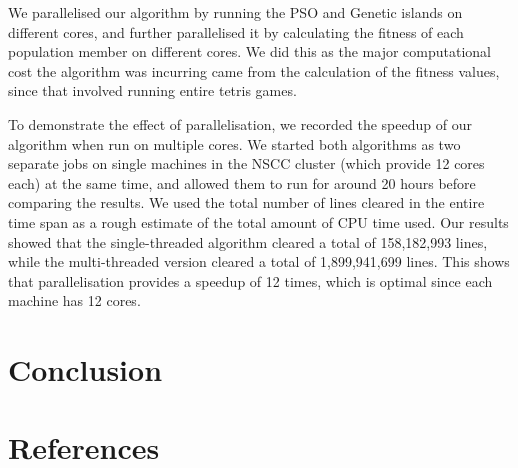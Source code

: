 \documentclass{article}
\begin{document}
We parallelised our algorithm by running the PSO and Genetic islands on
different cores, and further parallelised it by calculating the fitness of each
population member on different cores.  We did this as the major computational
cost the algorithm was incurring came from the calculation of the fitness
values, since that involved running entire tetris games.

To demonstrate the effect of parallelisation, we recorded the speedup of our
algorithm when run on multiple cores. We started both algorithms as two
separate jobs on single machines in the NSCC cluster (which provide 12 cores
each) at the same time, and allowed them to run for around 20 hours before
comparing the results. We used the total number of lines cleared in the entire
time span as a rough estimate of the total amount of CPU time used. Our results
showed that the single-threaded algorithm cleared a total of 158,182,993 lines,
while the multi-threaded version cleared a total of 1,899,941,699 lines. This
shows that parallelisation provides a speedup of 12 times, which is optimal
since each machine has 12 cores.

\section{Conclusion}



\section{References}


\end{document}
